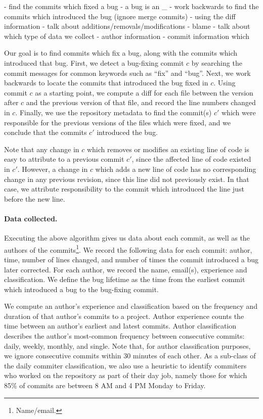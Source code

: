 - find the commits which fixed a bug
- a bug is an _
- work backwards to find the commits which introduced the bug (ignore merge commits)
 - using the diff information
 - talk about additions/removals/modifications
 - blame
- talk about which type of data we collect
 - author information
 - commit information which

Our goal is to find commits which fix a bug, along with the commits
which introduced that bug. First, we detect a bug-fixing commit $c$ by
searching the commit messages for common keywords such as ``fix'' and
``bug''. Next, we work backwards to locate the commits that introduced
the bug fixed in $c$. Using commit $c$ as a starting point, we compute
a diff for each file between the version after $c$ and the previous
version of that file, and record the line numbers changed in
$c$. Finally, we use the repository metadata to find the commit(s)
$c'$ which were responsible for the previous versions of the files
which were fixed, and we conclude that the commits $c'$ introduced the
bug.

Note that any change in $c$ which removes or modifies an existing line
of code is easy to attribute to a previous commit $c'$, since the
affected line of code existed in $c'$. However, a change in $c$ which
adds a new line of code has no corresponding change in any previous
revision, since this line did not previously exist. In that case, we
attribute responsibility to the commit which introduced the line just
before the new line.

\paragraph{Data collected.}
Executing the above algorithm gives us data about each commit, as well
as the authors of the commits\footnote{Name/email.}.  We record the
following data for each commit: author, time, number of lines changed,
and number of times the commit introduced a bug later corrected. For
each author, we record the name, email(s), experience and
classification. We define the bug lifetime as the time from the
earliest commit which introduced a bug to the bug-fixing commit.

We compute an author's experience and classification based on the
frequency and duration of that author's commits to a project. Author
experience counts the time between an author's earliest and latest
commits. Author classification describes the author's most-common
frequency between consecutive commits: daily, weekly, monthly, and
single. Note that, for author classification purposes, we ignore
consecutive commits within 30 minutes of each other. As a sub-class of
the daily commiter classification, we also use a heuristic to identify
commiters who worked on the repository as part of their day job,
namely those for which 85\% of commits are between 8 AM and 4 PM
Monday to Friday.

